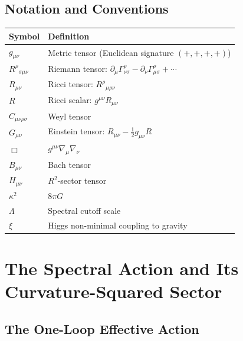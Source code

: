 \documentclass[11pt,a4paper]{article}
\theoremstyle{plain}
\theoremstyle{definition}
\begin{document}
\subsection{Notation and Conventions}

\begin{center}
\begin{tabular}{ll}
\toprule
Symbol & Definition \\
\midrule
$g_{\mu\nu}$ & Metric tensor (Euclidean signature $(+,+,+,+)$) \\
$R^{\rho}{}_{\sigma\mu\nu}$ & Riemann tensor:
  $\partial_\mu\Gamma^{\rho}_{\nu\sigma} - \partial_\nu\Gamma^{\rho}_{\mu\sigma} + \cdots$ \\
$R_{\mu\nu}$ & Ricci tensor: $R^{\rho}{}_{\mu\rho\nu}$ \\
$R$ & Ricci scalar: $g^{\mu\nu}R_{\mu\nu}$ \\
$C_{\mu\nu\rho\sigma}$ & Weyl tensor \\
$G_{\mu\nu}$ & Einstein tensor: $R_{\mu\nu} - \tfrac{1}{2}g_{\mu\nu}R$ \\
$\Box$ & $g^{\mu\nu}\nabla_\mu\nabla_\nu$ \\
$B_{\mu\nu}$ & Bach tensor \\
$H_{\mu\nu}$ & $R^2$-sector tensor \\
$\kappa^2$ & $8\pi G$ \\
$\Lambda$ & Spectral cutoff scale \\
$\xi$ & Higgs non-minimal coupling to gravity \\
\bottomrule
\end{tabular}
\end{center}

\section{The Spectral Action and Its Curvature-Squared Sector}
\label{sec:spectral-action}

\subsection{The One-Loop Effective Action}
\end{document}
